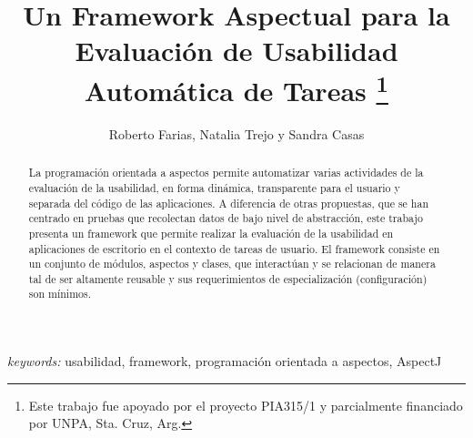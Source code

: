 \documentclass{llncs}
\begin{document}

\title{Un Framework Aspectual para la Evaluación de Usabilidad Automática de Tareas
\thanks{Este trabajo fue apoyado por el proyecto PIA315/1 y parcialmente financiado por UNPA, Sta. Cruz, Arg.}}


\author{
Roberto Farias, 
 Natalia Trejo y
 Sandra Casas    
}






\maketitle
\newcommand{\squeezeup}{\vspace{-2.5mm}}

\begin{abstract}
La programación orientada a aspectos permite automatizar varias actividades de la evaluación de la usabilidad, en forma dinámica, transparente para el usuario y separada del código de las aplicaciones. A diferencia de otras propuestas, que se han centrado en pruebas que recolectan datos de bajo nivel de abstracción, este trabajo presenta un framework que permite realizar la evaluación de la usabilidad en aplicaciones de escritorio en el contexto de tareas de usuario. El framework consiste en un conjunto de módulos, aspectos y clases, que interactúan y se relacionan de manera tal de ser altamente reusable y sus requerimientos de especialización (configuración) son mínimos. 
\end{abstract}
{\em keywords:} usabilidad, framework, programación orientada a aspectos, AspectJ









%





\end{document}
